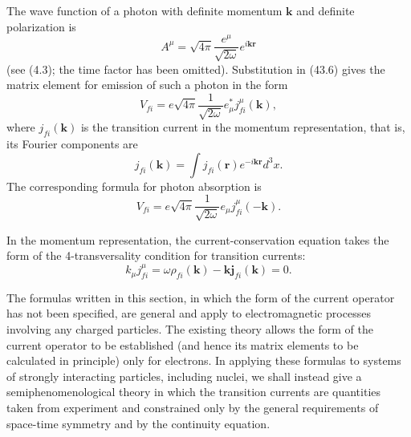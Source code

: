 The wave function of a photon with definite momentum $\mathbf k$ and definite polarization is
\begin{equation}
A^\mu=\sqrt{4\pi}\frac{e^\mu}{\sqrt{2\omega}}e^{i\mathbf k\mathbf r}
\tag{43.9}
\end{equation}
(see (4.3); the time factor has been omitted). Substitution in (43.6) gives the matrix element for emission of such a photon in the form
\begin{equation}
V_{fi}=e\sqrt{4\pi}\frac1{\sqrt{2\omega}}e_\mu^*j_{fi}^\mu(\mathbf k),
\tag{43.10}
\end{equation}
where $j_{fi}(\mathbf k)$ is the transition current in the momentum representation, that is, its Fourier components are
\begin{equation}
j_{fi}(\mathbf k)=\int j_{fi}(\mathbf r)e^{-i\mathbf k\mathbf r}d^3x.
\tag{43.11}
\end{equation}
The corresponding formula for photon absorption is
\begin{equation}
V_{fi}=e\sqrt{4\pi}\frac1{\sqrt{2\omega}}e_\mu j_{fi}^\mu(-\mathbf k).
\tag{43.12}
\end{equation}

In the momentum representation, the current-conservation equation takes the form of the 4-transversality condition for transition currents:
\begin{equation}
k_\mu j_{fi}^\mu=\omega\rho_{fi}(\mathbf k)-\mathbf k\mathbf j_{fi}(\mathbf k)=0.
\tag{43.13}
\end{equation}

The formulas written in this section, in which the form of the current operator has not been specified, are general and apply to electromagnetic processes involving any charged particles. The existing theory allows the form of the current operator to be established (and hence its matrix elements to be calculated in principle) only for electrons. In applying these formulas to systems of strongly interacting particles, including nuclei, we shall instead give a semiphenomenological theory in which the transition currents are quantities taken from experiment and constrained only by the general requirements of space-time symmetry and by the continuity equation.
